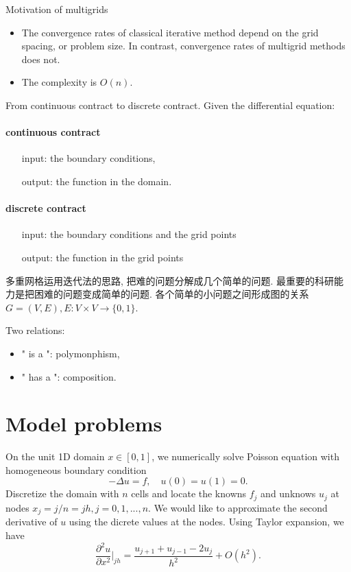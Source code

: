Motivation of multigrids
\begin{itemize}
\item The convergence rates of classical iterative method
  depend on the grid spacing, or problem size.
  In contrast, convergence rates of multigrid methods does not.
\item  The complexity is $O(n)$.
\end{itemize}

From continuous contract to discrete contract.
Given the differential equation:

\paragraph{continuous contract}
\begin{enumerate}
\item [input:] the boundary conditions,

\item  [output:] the function in the domain.
\end{enumerate}
\paragraph{discrete contract}
\begin{enumerate}
\item [input:] the boundary conditions and the grid points

 \item [output:] the function in the grid points
\end{enumerate}


\begin{CJK*}{UTF8}{gkai}
  多重网格运用迭代法的思路,
  把难的问题分解成几个简单的问题.
  最重要的科研能力是把困难的问题变成简单的问题.
  各个简单的小问题之间形成图的关系$G=(V,E),
  E:V\times V\rightarrow \{0,1\}$.
\end{CJK*}
Two relations:
\begin{itemize}
\item " is a ": polymonphism,
\item " has a ": composition.
\end{itemize}
\section{Model problems}
\label{sec:model-problems}

On the unit 1D domain $x\in[0,1]$,
we numerically solve Poisson equation with homogeneous boundary condition
\begin{displaymath}
  -\Delta u = f, \quad u(0) = u(1) = 0.
\end{displaymath}
Discretize the domain with $n$ cells and locate the knowns $f_j$
and unknows $u_j$ at nodes $x_j= j/n = jh,j=0,1,...,n.$
We would like to approximate the second derivative of $u$
using the dicrete values at the nodes.
Using Taylor expansion, we have
\begin{equation}
  \label{eq:2}
  \frac{\partial ^2u}{\partial x^2}\vert_{jh}
  =\frac{u_{j+1}+u_{j-1}-2u_j}{h^2}+O(h^2).
\end{equation}


